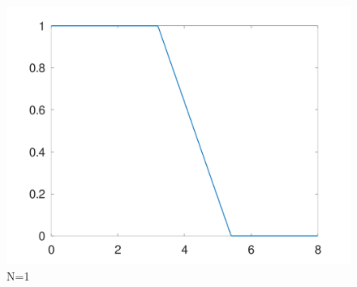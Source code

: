 \documentclass{article}
\begin{document}
\begin{figure}[!htbp]
{\begin{minipage}[b]{.3\linewidth}
  \includegraphics[scale=0.1]{figures/Assignment_G_N1_1_1.png}
  \end{minipage}
  }
  \newline
  \caption{N=1}
  \end{figure}
\end{document}

